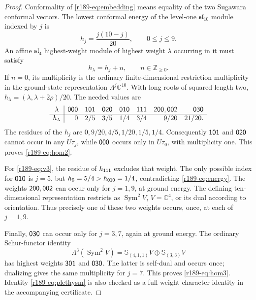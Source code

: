 \begin{proof}
Conformality of \eqref{r189-eq:embedding} means equality of the two Sugawara
conformal vectors. The lowest conformal energy of the level-one
$\mathfrak{sl}_{10}$ module indexed by $j$ is
\[
 h_j=\frac{j(10-j)}{20},\qquad 0\leq j\leq9.
\]
An affine $\mathfrak{sl}_4$ highest-weight module of highest weight
$\lambda$ occurring in it must satisfy
\begin{equation}\label{r189-eq:energy}
 h_\lambda=h_j+n,\qquad n\in\mathbb Z_{\geq0}.
\end{equation}
If $n=0$, its multiplicity is the ordinary finite-dimensional
restriction multiplicity in the ground-state representation
$\Lambda^j\mathbb C^{10}$. With long roots of squared length two,
$h_\lambda=(\lambda,\lambda+2\rho)/20$. The needed values are
\[
\begin{array}{c|rrrrrrr}
\lambda&\mathsf{000}&\mathsf{101}&\mathsf{020}&\mathsf{010}&\mathsf{111}
 &\mathsf{200},\mathsf{002}&\mathsf{030}\\ \hline
h_\lambda&0&2/5&3/5&1/4&3/4&9/20&21/20.
\end{array}
\]
The residues of the $h_j$ are
$0,9/20,4/5,1/20,1/5,1/4$. Consequently $\mathsf{101}$ and
$\mathsf{020}$ cannot occur in any $U\tau_j$, while $\mathsf{000}$ occurs
only in $U\tau_0$, with multiplicity one. This proves \eqref{r189-eq:hom2}.

For \eqref{r189-eq:v3}, the residue of $h_{\mathsf{111}}$ excludes that weight.
The only possible index for $\mathsf{010}$ is $j=5$, but
$h_5=5/4>h_{\mathsf{010}}=1/4$, contradicting \eqref{r189-eq:energy}. The weights
$\mathsf{200},\mathsf{002}$ can occur only for $j=1,9$, at ground energy.
The defining ten-dimensional representation restricts as
$\operatorname{Sym}^2 V$, $V=\mathbb C^4$, or its dual according to
orientation. Thus precisely one of these two weights occurs, once, at
each of $j=1,9$.

Finally, $\mathsf{030}$ can occur only for $j=3,7$, again at ground energy.
The ordinary Schur-functor identity
\begin{equation}\label{r189-eq:plethysm}
 \Lambda^3(\operatorname{Sym}^2 V)
 =\mathbb S_{(4,1,1)}V\oplus\mathbb S_{(3,3)}V
\end{equation}
has highest weights $\mathsf{301}$ and $\mathsf{030}$. The latter is self-dual
and occurs once; dualizing gives the same multiplicity for $j=7$.
This proves \eqref{r189-eq:hom3}. Identity \eqref{r189-eq:plethysm} is also checked
as a full weight-character identity in the accompanying certificate.
\end{proof}

